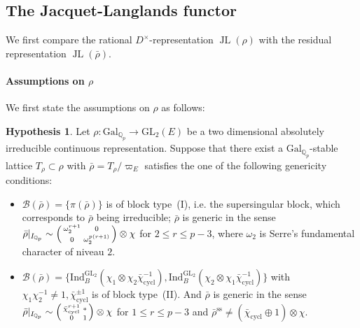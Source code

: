\documentclass[11pt]{article}
\theoremstyle{definition}
\newtheorem{hypothesis}[theorem]{Hypothesis}
\newcommand{\JL}{\operatorname{JL}}
\begin{document}
\subsection{The Jacquet-Langlands functor}
\label{sec:HW-tori}
We first compare the rational $D^\times$-representation
$\JL(\rho)$ with the residual representation $\JL(\bar\rho)$.

\paragraph{Assumptions on \texorpdfstring{$\rho$}{rho}}
We first state the assumptions on $\rho$ as follows:
\begin{hypothesis}\label{hypothesis}
Let $\rho\colon\mathrm{Gal}_{\mathbb{Q}_p}\to\mathrm{GL}_2(E)$ be a two dimensional absolutely irreducible continuous representation. Suppose that 
there exist a $\mathrm{Gal}_{\mathbb{Q}_p}$-stable lattice $T_\rho\subset\rho$ with $\bar{\rho}=T_\rho/\varpi_E$ satisfies the one of the following genericity conditions:
\begin{itemize}
      \item[Type~(I)] 
             $\mathscr B(\bar\rho)=\{\pi(\bar{\rho})\}$ is of block type~(I), i.e. the supersingular block, which corresponds to $\bar{\rho}$ being irreducible;  $\bar{\rho}$ is generic in the sense $\bar{\rho}|_{I_{\mathbb{Q}_p}}\sim\begin{psmallmatrix}
                  \omega_2^{r+1} & 0 \\ 0 & \omega_2^{p(r+1)}
            \end{psmallmatrix}\otimes\chi$ for $2\le r\le p-3$, where $\omega_2$ is Serre's fundamental character of niveau $2$.
            
            \item[Type~(II)] $\mathscr B(\bar\rho)=\{\mathrm{Ind}_B^{\mathrm{GL_2}}(\chi_1\otimes\chi_2\bar{\chi}_{\mathrm{cycl}}^{-1}), \mathrm{Ind}_B^{\mathrm{GL}_2}(\chi_2\otimes\chi_1\bar{\chi}_{\mathrm{cycl}}^{-1})\}$ 
                  with $\chi_1\chi_2^{-1}\neq1,\bar{\chi}_{\mathrm{cycl}}^{\pm1}$ is of block type~(II). And $\bar{\rho}$ is generic in the sense $\bar{\rho}|_{I_{\mathbb{Q}_p}}\sim\begin{psmallmatrix}
                  \bar{\chi}_{\mathrm{cycl}}^{r+1} & * \\ 0 & 1
            \end{psmallmatrix}\otimes\chi$ for $1\le r\le p-3$ and $\bar{\rho}^{\mathrm{ss}}\neq(\bar{\chi}_{\mathrm{cycl}}\oplus1)\otimes\chi$.
\end{itemize}

\end{hypothesis}
\end{document}
